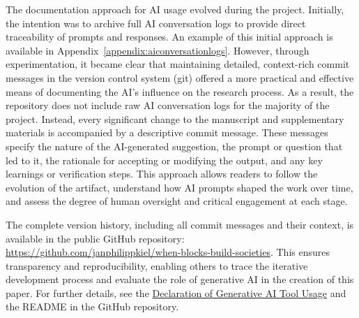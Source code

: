 \documentclass[a4paper, 12pt]{article}
\begin{document}
The documentation approach for AI usage evolved during the project. Initially, the intention was to archive full AI conversation logs to provide direct traceability of prompts and responses. An example of this initial approach is available in Appendix~\ref{appendix:aiconversationlogs}. However, through experimentation, it became clear that maintaining detailed, context-rich commit messages in the version control system (git) offered a more practical and effective means of documenting the AI's influence on the research process. As a result, the repository does not include raw AI conversation logs for the majority of the project. Instead, every significant change to the manuscript and supplementary materials is accompanied by a descriptive commit message. These messages specify the nature of the AI-generated suggestion, the prompt or question that led to it, the rationale for accepting or modifying the output, and any key learnings or verification steps. This approach allows readers to follow the evolution of the artifact, understand how AI prompts shaped the work over time, and assess the degree of human oversight and critical engagement at each stage.

The complete version history, including all commit messages and their context, is available in the public GitHub repository: \url{https://github.com/janphilippkiel/when-blocks-build-societies}. This ensures transparency and reproducibility, enabling others to trace the iterative development process and evaluate the role of generative AI in the creation of this paper. For further details, see the \hyperref[sec:declaration-gen-ai]{Declaration of Generative AI Tool Usage} and the README in the GitHub repository.

\vspace*{\fill}
\clearpage
\end{document}
